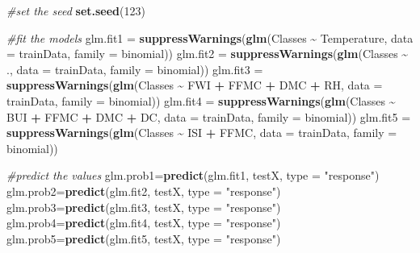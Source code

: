 \documentclass[
]{article}
\newenvironment{Shaded}{\begin{snugshade}}{\end{snugshade}}
\newcommand{\AttributeTok}[1]{\textcolor[rgb]{0.13,0.29,0.53}{#1}}
\newcommand{\CommentTok}[1]{\textcolor[rgb]{0.56,0.35,0.01}{\textit{#1}}}
\newcommand{\DecValTok}[1]{\textcolor[rgb]{0.00,0.00,0.81}{#1}}
\newcommand{\FunctionTok}[1]{\textcolor[rgb]{0.13,0.29,0.53}{\textbf{#1}}}
\newcommand{\NormalTok}[1]{#1}
\newcommand{\OtherTok}[1]{\textcolor[rgb]{0.56,0.35,0.01}{#1}}
\newcommand{\SpecialCharTok}[1]{\textcolor[rgb]{0.81,0.36,0.00}{\textbf{#1}}}
\newcommand{\StringTok}[1]{\textcolor[rgb]{0.31,0.60,0.02}{#1}}
\begin{document}
\begin{Shaded}
\begin{Highlighting}[]
\CommentTok{\#set the seed}
\FunctionTok{set.seed}\NormalTok{(}\DecValTok{123}\NormalTok{)}

\CommentTok{\#fit the models}
\NormalTok{glm.fit1 }\OtherTok{=} \FunctionTok{suppressWarnings}\NormalTok{(}\FunctionTok{glm}\NormalTok{(Classes }\SpecialCharTok{\textasciitilde{}}\NormalTok{ Temperature, }\AttributeTok{data =}\NormalTok{ trainData, }\AttributeTok{family =}\NormalTok{ binomial))}
\NormalTok{glm.fit2 }\OtherTok{=} \FunctionTok{suppressWarnings}\NormalTok{(}\FunctionTok{glm}\NormalTok{(Classes }\SpecialCharTok{\textasciitilde{}}\NormalTok{ ., }\AttributeTok{data =}\NormalTok{ trainData, }\AttributeTok{family =}\NormalTok{ binomial))}
\NormalTok{glm.fit3 }\OtherTok{=} \FunctionTok{suppressWarnings}\NormalTok{(}\FunctionTok{glm}\NormalTok{(Classes }\SpecialCharTok{\textasciitilde{}}\NormalTok{ FWI }\SpecialCharTok{+}\NormalTok{ FFMC }\SpecialCharTok{+}\NormalTok{ DMC }\SpecialCharTok{+}\NormalTok{ RH, }\AttributeTok{data =}\NormalTok{ trainData, }\AttributeTok{family =}\NormalTok{ binomial))}
\NormalTok{glm.fit4 }\OtherTok{=} \FunctionTok{suppressWarnings}\NormalTok{(}\FunctionTok{glm}\NormalTok{(Classes }\SpecialCharTok{\textasciitilde{}}\NormalTok{ BUI }\SpecialCharTok{+}\NormalTok{ FFMC }\SpecialCharTok{+}\NormalTok{ DMC }\SpecialCharTok{+}\NormalTok{ DC, }\AttributeTok{data =}\NormalTok{ trainData, }\AttributeTok{family =}\NormalTok{ binomial))}
\NormalTok{glm.fit5 }\OtherTok{=} \FunctionTok{suppressWarnings}\NormalTok{(}\FunctionTok{glm}\NormalTok{(Classes }\SpecialCharTok{\textasciitilde{}}\NormalTok{ ISI }\SpecialCharTok{+}\NormalTok{ FFMC, }\AttributeTok{data =}\NormalTok{ trainData, }\AttributeTok{family =}\NormalTok{ binomial))}

\CommentTok{\#predict the values}
\NormalTok{glm.prob1}\OtherTok{=}\FunctionTok{predict}\NormalTok{(glm.fit1, testX, }\AttributeTok{type =} \StringTok{"response"}\NormalTok{)}
\NormalTok{glm.prob2}\OtherTok{=}\FunctionTok{predict}\NormalTok{(glm.fit2, testX, }\AttributeTok{type =} \StringTok{"response"}\NormalTok{)}
\NormalTok{glm.prob3}\OtherTok{=}\FunctionTok{predict}\NormalTok{(glm.fit3, testX, }\AttributeTok{type =} \StringTok{"response"}\NormalTok{)}
\NormalTok{glm.prob4}\OtherTok{=}\FunctionTok{predict}\NormalTok{(glm.fit4, testX, }\AttributeTok{type =} \StringTok{"response"}\NormalTok{)}
\NormalTok{glm.prob5}\OtherTok{=}\FunctionTok{predict}\NormalTok{(glm.fit5, testX, }\AttributeTok{type =} \StringTok{"response"}\NormalTok{)}


\end{Highlighting}
\end{Shaded}
\end{document}
